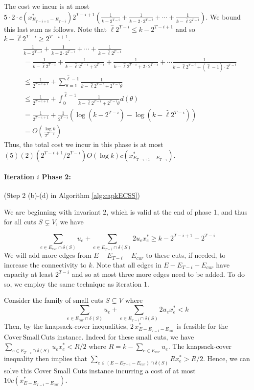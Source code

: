 \documentclass[11pt]{article}
\newcommand\ASC{\mathrm{Cover\,Small\,Cuts}}
\newcommand{\alphatwo}{2}
\begin{document}
{The cost we incur is at most $5 \cdot \alphatwo \cdot  c(x^*_{E_{T-i+1}-E_{T-i}})2^{T-i+1}
(\frac{1}{k-2^{T-i}} + \frac{1}{k-2\cdot2^{T-i}} +
\cdots+\frac{1}{k-\hat{\ell}2^{T-i}})$. We bound this last sum as
follows. Note that $\hat{\ell} 2^{T-i} \leq k - 2^{T-i+1}$ and so
$k-\hat{\ell}2^{T-i} \geq 2^{T-i+1}$.
\begin{align*}
    &\frac{1}{k-2^{T-i}} + \frac{1}{k-2\cdot2^{T-i}} + \cdots+\frac{1}{k-\hat{\ell}2^{T-i}} \\
    &= \frac{1}{k-\hat{\ell}2^{T-i}} + \frac{1}{k-\hat{\ell}2^{T-i} + 2^{T-i}}+ \frac{1}{k-\hat{\ell}2^{T-i} + 2\cdot 2^{T-i}} + \cdots \frac{1}{k-\hat{\ell}2^{T-i} + (\hat{\ell}-1)\cdot 2^{T-i}}\\
    &\leq \frac{1}{2^{T-i+1}} + \sum_{\theta = 1}^{\hat{\ell}-1} \frac{1}{k-\hat{\ell}2^{T-i} + 2^{T-i}\theta}\\
    &\leq \frac{1}{2^{T-i+1}} + \int_0^{\hat{\ell}-1} \frac{1}{k-\hat{\ell}2^{T-i} + 2^{T-i}\theta} d(\theta)\\
    & = \frac{1}{2^{T-i+1}}+ \frac{1}{2^{T-i}}\left(\log(k-2^{T-i}) - \log(k-\hat{\ell}2^{T-i})\right)\\
    & = O(\frac{\log k}{2^{T-i}})
\end{align*}
Thus, the total cost we incur in this phase is at most
$(5)(\alphatwo) (2^{T-i+1}/2^{T-i})O(\log k) c(x^*_{E_{T-i+1}-E_{T-i}})$.

\paragraph{Iteration $i$ Phase 2:} (Step 2 (b)-(d) in Algorithm \ref{alg:capkECSS})

We are beginning with invariant 2, which is valid at the end of phase 1, and thus for all cuts $S \subsetneq V$, we have

\[
    \sum_{e\in E_{cur} \cap \delta(S)}u_e + \sum_{e\in E_{T-i} \cap \delta(S)}\alphatwo u_ex^*_e \geq k-2^{T-i+1} - 2^{T-i}
\]
We will add more edges from $E-E_{T-i}-E_{cur}$ to these cuts, if needed, to
increase the connectivity to $k$. Note that all edges in
$E-E_{T-i}-E_{cur}$ have capacity at least $2^{T-i}$ and so at most three more edges need to be added. To do so, we employ the same
technique as iteration 1.

Consider the family of small cuts $S \subsetneq V$ where
\[
\sum_{e\in E_{cur} \cap \delta(S)} u_e + \sum_{e\in E_{T-i} \cap \delta(S)}\alphatwo u_e x^*_e <k
\]
Then, by the knapsack-cover inequalities,
$\alphatwo\,x^*_{E-E_{T-i}-E_{cur}}$ is feasible for
the $\ASC$ instance. Indeed for these small cuts, we have $\sum_{e\in
E_{T-i} \cap \delta(S)}u_ex^*_e < R/\alphatwo$ where $R = k - \sum_{e\in E_{cur}}u_e$.
The knapsack-cover inequality then implies that $\sum_{e\in (E-E_{T-i} - E_{cur}) \cap \delta(S)}
R x^*_e > R/\alphatwo$. Hence, we can solve this Cover Small Cuts instance incurring a cost of at most $10c(x^*_{E-E_{T-i}-E_{cur}})$.

}
\end{document}
